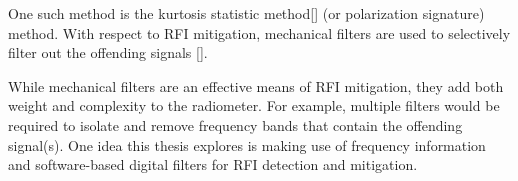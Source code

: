 One such method is the kurtosis statistic method[\cite{DeRoo}] (or polarization signature) method.  With respect to RFI mitigation, mechanical filters are used to selectively filter out the offending signals [\cite{DeRooRFI}].  

While mechanical filters are an effective means of RFI mitigation, they add both weight and complexity to the radiometer.  For example, multiple filters would be required to isolate and remove frequency bands that contain the offending signal(s).  One idea this thesis explores is making use of frequency information and software-based digital filters for RFI detection and mitigation.



